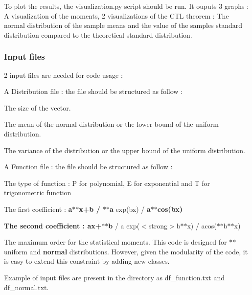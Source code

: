 To plot the results, the \textquotesingle{}visualization.\+py\textquotesingle{} script should be run. It ouputs 3 graphs \+: A visualization of the moments, 2 visualizations of the C\+TL theorem \+: The normal distribution of the sample means and the value of the sample\textquotesingle{}s standard distribution compared to the theoretical standard distribution.

\subsubsection*{Input files}

2 input files are needed for code usage \+:
\begin{DoxyItemize}
\item A Distribution file \+: the file should be structured as follow \+:
\begin{DoxyItemize}
\item The size of the vector.
\item The mean of the normal distribution or the lower bound of the uniform distribution.
\item The variance of the distribution or the upper bound of the uniform distribution.
\end{DoxyItemize}
\item A Function file \+: the file should be structured as follow \+:
\begin{DoxyItemize}
\item The type of function \+: \textquotesingle{} P \textquotesingle{} for polynomial, \textquotesingle{}E\textquotesingle{} for exponential and \textquotesingle{}T\textquotesingle{} for trigonometric function
\item The first coefficient \+: {\bfseries a$\ast$$\ast$x+b / $\ast$$\ast$a} exp(bx) / {\bfseries a$\ast$$\ast$cos(bx)}
\item {\bfseries The second coefficient \+: ax+$\ast$$\ast$b} / a exp($<$strong$>$b$\ast$$\ast$x) / acos($\ast$$\ast$b$\ast$$\ast$x)
\item The maximum order for the statistical moments. This code is designed for $\ast$$\ast$uniform and {\bfseries normal} distributions. However, given the modularity of the code, it is easy to extend this constraint by adding new classes.
\end{DoxyItemize}
\end{DoxyItemize}

Example of input files are present in the directory as df\+\_\+function.\+txt and df\+\_\+normal.\+txt.

